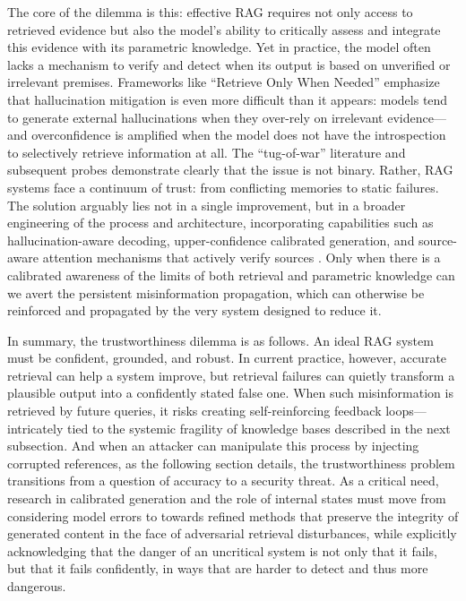 \documentclass[11pt]{article}
\begin{document}
The core of the dilemma is this: effective RAG requires not only access to retrieved evidence but also the model's ability to critically assess and integrate this evidence with its parametric knowledge. Yet in practice, the model often lacks a mechanism to verify and detect when its output is based on unverified or irrelevant premises. Frameworks like ``Retrieve Only When Needed'' \cite{ref150} emphasize that hallucination mitigation is even more difficult than it appears: models tend to generate external hallucinations when they over-rely on irrelevant evidence---and overconfidence is amplified when the model does not have the introspection to selectively retrieve information at all. The ``tug-of-war'' literature and subsequent probes demonstrate clearly that the issue is not binary. Rather, RAG systems face a continuum of trust: from conflicting memories to static failures. The solution arguably lies not in a single improvement, but in a broader engineering of the process and architecture, incorporating capabilities such as hallucination-aware decoding, upper-confidence calibrated generation, and source-aware attention mechanisms that actively verify sources \cite{ref47}. Only when there is a calibrated awareness of the limits of both retrieval and parametric knowledge can we avert the persistent misinformation propagation, which can otherwise be reinforced and propagated by the very system designed to reduce it.

In summary, the trustworthiness dilemma is as follows. An ideal RAG system must be confident, grounded, and robust. In current practice, however, accurate retrieval can help a system improve, but retrieval failures can quietly transform a plausible output into a confidently stated false one. When such misinformation is retrieved by future queries, it risks creating self-reinforcing feedback loops---intricately tied to the systemic fragility of knowledge bases described in the next subsection. And when an attacker can manipulate this process by injecting corrupted references, as the following section details, the trustworthiness problem transitions from a question of accuracy to a security threat. As a critical need, research in calibrated generation and the role of internal states \cite{ref47} must move from considering model errors to towards refined methods that preserve the integrity of generated content in the face of adversarial retrieval disturbances, while explicitly acknowledging that the danger of an uncritical system is not only that it fails, but that it fails confidently, in ways that are harder to detect and thus more dangerous.
\end{document}
